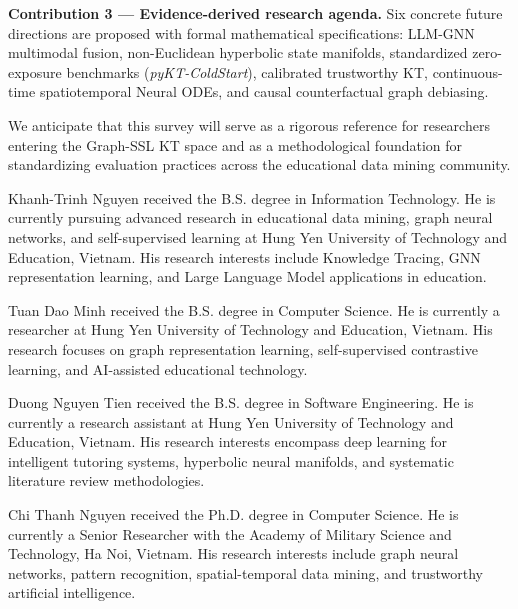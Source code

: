 \documentclass[10pt,journal,compsoc]{IEEEtran}
\begin{document}
\textbf{Contribution 3 --- Evidence-derived research agenda.} Six concrete future directions are proposed with formal mathematical specifications: LLM-GNN multimodal fusion, non-Euclidean hyperbolic state manifolds, standardized zero-exposure benchmarks (\textit{pyKT-ColdStart}), calibrated trustworthy KT, continuous-time spatiotemporal Neural ODEs, and causal counterfactual graph debiasing.

We anticipate that this survey will serve as a rigorous reference for researchers entering the Graph-SSL KT space and as a methodological foundation for standardizing evaluation practices across the educational data mining community.




\begin{IEEEbiographynophoto}{Khanh-Trinh Nguyen}
received the B.S. degree in Information Technology. He is currently pursuing advanced research in educational data mining, graph neural networks, and self-supervised learning at Hung Yen University of Technology and Education, Vietnam. His research interests include Knowledge Tracing, GNN representation learning, and Large Language Model applications in education.
\end{IEEEbiographynophoto}

\begin{IEEEbiographynophoto}{Tuan Dao Minh}
received the B.S. degree in Computer Science. He is currently a researcher at Hung Yen University of Technology and Education, Vietnam. His research focuses on graph representation learning, self-supervised contrastive learning, and AI-assisted educational technology.
\end{IEEEbiographynophoto}

\begin{IEEEbiographynophoto}{Duong Nguyen Tien}
received the B.S. degree in Software Engineering. He is currently a research assistant at Hung Yen University of Technology and Education, Vietnam. His research interests encompass deep learning for intelligent tutoring systems, hyperbolic neural manifolds, and systematic literature review methodologies.
\end{IEEEbiographynophoto}

\begin{IEEEbiographynophoto}{Chi Thanh Nguyen}
received the Ph.D. degree in Computer Science. He is currently a Senior Researcher with the Academy of Military Science and Technology, Ha Noi, Vietnam. His research interests include graph neural networks, pattern recognition, spatial-temporal data mining, and trustworthy artificial intelligence.
\end{IEEEbiographynophoto}
\end{document}
